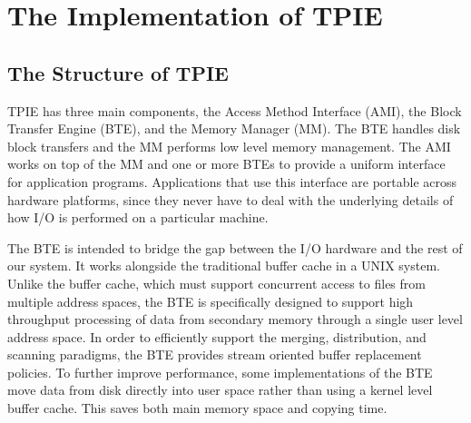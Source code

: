 \chapter{The Implementation of TPIE}
\label{cha:implementation}


\section{The Structure of TPIE}

TPIE has three main components, the Access Method Interface
(AMI), the Block Transfer Engine
(BTE), and the Memory Manager
(MM).  The BTE handles disk block transfers
and the MM performs low level memory management.
The AMI works on top of the MM and one or more BTEs
to provide a uniform interface for application programs. Applications that
use this interface are portable across hardware platforms, since they never
have to deal with the underlying details of how I/O is performed on a
particular machine.

The BTE is intended to bridge the gap between the I/O hardware and the rest
of our system.  It works alongside the traditional buffer
cache in a UNIX system.  Unlike the buffer
cache, which must support concurrent access to files
from multiple address spaces, the BTE is specifically designed to support
high throughput processing of data from secondary memory through a single
user level address space.  In order to efficiently support the merging,
distribution, and scanning paradigms, the BTE provides stream oriented
buffer replacement policies. To further improve performance, some implementations of the BTE move
data from disk directly into user space rather than using a kernel level
buffer cache.  This saves both main memory space and
copying time.

